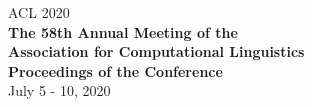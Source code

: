 \documentclass[11pt,a4paper]{article}
\begin{document}
  \begin{center}
  \LARGE
  ACL 2020 \\
  \vfill
  {\bf
    The 58th Annual Meeting of the \\
    Association for Computational Linguistics\\
    \vfill
    Proceedings of the Conference\\
  }
  \vfill
  July 5 - 10, 2020
  \end{center}
\end{document}
